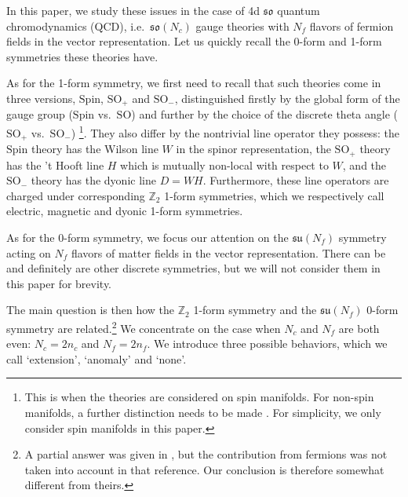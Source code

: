 \documentclass[12pt]{article}
\numberwithin{equation}{section}
\def\bZ{\mathbb{Z}}
\def\SO{\mathrm{SO}}
\def\su{\mathfrak{su}}
\def\so{\mathfrak{so}}
\def\Spin{\mathrm{Spin}}
\begin{document}
In this paper, we study these issues in the case of 4d $\so$ quantum chromodynamics (QCD),
i.e.~$\so(N_c)$ gauge theories with 
$N_f$ flavors of fermion fields in the vector representation.
Let us quickly recall the 0-form and 1-form symmetries these theories have.

As for the 1-form symmetry, we first need to recall that 
such theories come in three versions, $\Spin$, $\SO_+$ and $\SO_-$,
distinguished firstly by the global form of the gauge group ($\Spin$ vs.~$\SO$)
and further by the choice of the discrete theta angle ($\SO_+$ vs.~$\SO_-$) \cite{Aharony:2013hda}\footnote{%
This is when the theories are considered on spin manifolds.
For non-spin manifolds, a further distinction needs to be made \cite{Ang:2019txy}.
For simplicity, we only consider spin manifolds in this paper.
}.
They also differ by the nontrivial line operator they possess: 
the $\Spin$ theory has the Wilson line $W$ in the spinor representation,
the $\SO_+$ theory has the 't Hooft line $H$ which is mutually non-local with respect to $W$,
and the $\SO_-$ theory has the dyonic line $D=WH$. 
Furthermore, these line operators are charged under corresponding $\bZ_2$ 1-form symmetries,
which we respectively call electric, magnetic and dyonic 1-form symmetries.

As for the 0-form symmetry, 
we focus our attention on the $\su(N_f)$ symmetry acting on $N_f$ flavors of matter fields 
in the vector representation.
There can be and definitely are other discrete symmetries, but we will not consider them in this paper for brevity.

The main question is then how the $\bZ_2$ 1-form symmetry and the $\su(N_f)$ 0-form symmetry are related.\footnote{%
A partial answer was given in \cite{Hsin:2020nts}, but the contribution from fermions was not taken into account in that reference.
Our conclusion is therefore somewhat different from theirs.
}
We concentrate on the case when $N_c$ and $N_f$ are both even: $N_c=2n_c$ and $N_f=2n_f$.
We introduce three possible behaviors, which we call `extension', `anomaly' and `none'.
\end{document}
